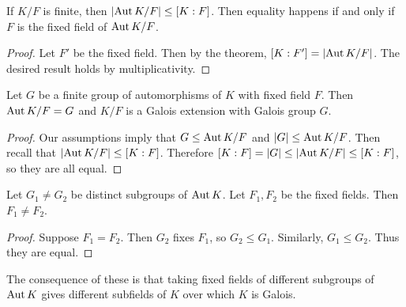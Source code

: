 \message{ !name(notes.tex)}\documentclass[10pt, twoside]{article}
\begin{document}
    \begin{cor}
        If $K/F$ is finite, then $\lvert\operatorname{Aut}{K/F}\rvert \leq [K:F]$. Then equality happens if and only if $F$ is the fixed field of $\operatorname{Aut}{K/F}$.
        \begin{proof}
            Let $F'$ be the fixed field. Then by the theorem, $[K:F'] = \lvert\operatorname{Aut}{K/F}\rvert$. The desired result holds by multiplicativity.
        \end{proof}
    \end{cor}
    
    \begin{cor}
        Let $G$ be a finite group of automorphisms of $K$ with fixed field $F$. Then $\operatorname{Aut}{K/F} = G$ and $K/F$ is a Galois extension with Galois group $G$.
        \begin{proof}
            Our assumptions imply that $G \leq \operatorname{Aut}{K/F}$ and $\lvert G\rvert \leq \operatorname{Aut}{K/F}$. Then recall that $\lvert\operatorname{Aut}{K/F}\rvert \leq [K:F]$. Therefore $[K:F] = \lvert G\rvert \leq \lvert\operatorname{Aut}{K/F}\rvert \leq [K:F]$, so they are all equal.
        \end{proof}
    \end{cor}

    \begin{cor}
        Let $G_1 \neq G_2$ be distinct subgroups of $\operatorname{Aut}{K}$. Let $F_1,F_2$ be the fixed fields. Then $F_1 \neq F_2$.
        \begin{proof}
            Suppose $F_1 = F_2$. Then $G_2$ fixes $F_1$, so $G_2 \leq G_1$. Similarly, $G_1 \leq G_2$. Thus they are equal.
        \end{proof}
    \end{cor}

    The consequence of these is that taking fixed fields of different subgroups of $\operatorname{Aut}{K}$ gives different subfields of $K$ over which $K$ is Galois.
\end{document}
